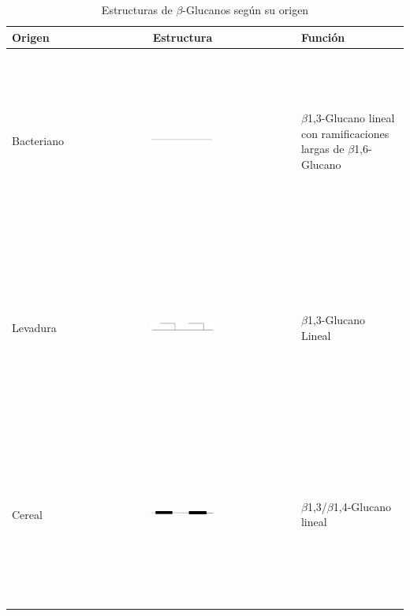 \documentclass[11pt,a4paper,]{article}
\begin{document}
\begin{table}[h]
\begin{center}
\sffamily
\begin{threeparttable}
\caption{Estructuras de $\beta$-Glucanos según su origen}\label{tablaglucanos}
\begin{tabular}{l c l}
\toprule
Origen & Estructura & Función \\
\midrule
Bacteriano & \includegraphics[width=0.3\textwidth, height=60mm]{bgbacteriano} & $\beta$1,3-Glucano lineal con ramificaciones largas de $\beta$1,6-Glucano\\
Levadura & \includegraphics[width=0.3\textwidth, height=60mm]{bglevadura} & $\beta$1,3-Glucano Lineal \\ 
Cereal & \includegraphics[width=0.3\textwidth, height=60mm]{bgcereal} & $\beta$1,3/$\beta$1,4-Glucano lineal \\

\end{tabular}
\end{threeparttable}
\end{center}
\end{table}
\end{document}
